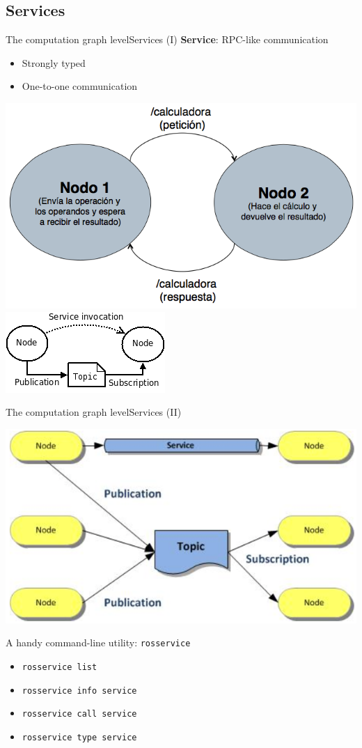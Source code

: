 \documentclass[10pt,compress]{beamer} %
\begin{document}
\subsection{Services}
\begin{frame}{The computation graph level}{Services (I)}
	\textbf{Service}: RPC-like communication
	\begin{itemize}
	\item Strongly typed
	\item One-to-one communication
	\end{itemize}
	\begin{center}
	\includegraphics[width=0.45\linewidth]{figs/topic2.png}
	\includegraphics[width=0.45\linewidth]{figs/topic.png}
	\end{center}
\end{frame}

\begin{frame}{The computation graph level}{Services (II)}
	\vspace{-0.2cm}
	\begin{center}
	\includegraphics[width=0.6\linewidth]{figs/comparativa.png}
	\end{center}
	\vspace{-0.2cm}
	A handy command-line utility: \alert{\texttt{rosservice}}
  	\begin{itemize}
		\item \texttt{rosservice list}
		\item \texttt{rosservice info service}
		\item \texttt{rosservice call service}
		\item \texttt{rosservice type service}
	\end{itemize}
\end{frame}
\end{document}
